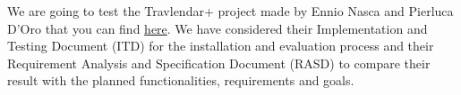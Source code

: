 We are going to test the Travlendar+ project made by Ennio Nasca and Pierluca D'Oro that you can find \href{https://github.com/ennnas/DoroNasca}{here}. We have considered their Implementation and Testing Document (ITD) for the installation and evaluation process and their Requirement Analysis and Specification Document (RASD) to compare their result with the planned functionalities, requirements and goals.